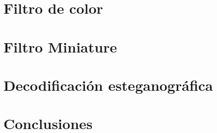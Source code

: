 \documentclass[10pt, a4paper]{article}
\begin{document}
	\section{Filtro de color}
		
	\clearpage

	\section{Filtro Miniature}
		
	\clearpage

	\section{Decodificación esteganográfica}
		
	\clearpage

	\section{Conclusiones}
		
\end{document}
